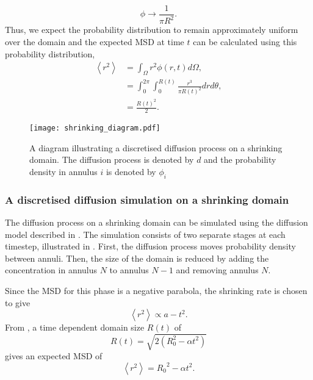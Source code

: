   \begin{equation}
  \phi \rightarrow \frac{1}{\pi R^2}.
  \label{eqn:uniform_circle}
  \end{equation}
Thus, we expect the probability distribution to remain
 approximately uniform over the domain and the expected MSD at time $t$ can be calculated using this probability distribution,
 \begin{align}
 \left<r^2\right> 	&= \int_{\Omega}r^2 \phi(r,t) d\Omega , \nonumber\\
                 	&= \int_0^{2\pi}\int_0^{R(t)} \frac{r^3}{\pi R(t)^2} dr d\theta, \nonumber \\
	                &= \frac{R(t)^2}{2} .
 \label{eqn:shrink_domain}
 \end{align}
   \begin{figure} [h]
       \centering
           \texttt{[image: shrinking\_diagram.pdf]}
           \caption{A diagram illustrating a discretised diffusion process on a shrinking domain. The diffusion process is denoted by $d$ and the probability density in annulus $i$ is denoted by $\phi_i$}
       \label{fig:shrinking_diagram}
   \end{figure}
%
\subsubsection{A discretised diffusion simulation on a shrinking domain}
The diffusion process on a shrinking domain can be simulated using the diffusion model described in . The simulation consists of two separate stages at each timestep, illustrated in . First, the diffusion process moves probability density between annuli. Then, the size of the domain is reduced by adding the concentration in annulus $N$ to annulus $N-1$ and removing annulus $N$.

Since the MSD for this phase is a negative parabola, the shrinking rate is chosen to give
%
 \begin{equation}
 \left<r^2\right> \propto a - t^2.
 \label{eqn:MSD_shrink}
 \end{equation}
%
From , a time dependent domain size $R(t)$ of
%
\begin{equation}
R(t) = \sqrt{2(R_0^2 - \alpha t^2)}
\label{eqn:Rt}
\end{equation}
%
gives an expected MSD of
 \begin{equation}
 \left<r^2\right> = {R_0}^2 -\alpha t^2.
 \end{equation}

